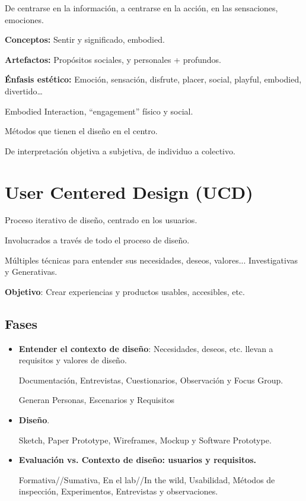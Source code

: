 \documentclass[12pt, twoside, openright]{report} %
\begin{document}
De centrarse en la información, a centrarse en la acción, en las
sensaciones, emociones.

\textbf{Conceptos:} Sentir y significado, embodied.

\textbf{Artefactos:} Propósitos sociales, y personales + profundos.

\textbf{Énfasis estético:} Emoción, sensación, disfrute, placer, social,
playful, embodied, divertido\ldots{}

Embodied Interaction, \enquote{engagement} físico y social.

Métodos que tienen el diseño en el centro.

De interpretación objetiva a subjetiva, de individuo a colectivo.

\section{User Centered Design (UCD)}

Proceso iterativo de diseño, centrado en los usuarios.

Involucrados a través de todo el proceso de diseño.

Múltiples técnicas para entender sus necesidades, deseos,
valores... Investigativas y Generativas.

\textbf{Objetivo}: Crear experiencias y productos usables, accesibles,
etc.
\pagebreak

\subsection{Fases}

\begin{itemize}
	\item \textbf{Entender el contexto de diseño}: Necesidades, deseos, etc.
	      llevan a requisitos y valores de diseño.

	      Documentación, Entrevistas, Cuestionarios, Observación y Focus Group.

	      Generan Personas, Escenarios y Requisitos
	\item \textbf{Diseño}.

	      Sketch, Paper Prototype, Wireframes, Mockup y Software Prototype.
	\item \textbf{Evaluación vs. Contexto de diseño: usuarios y requisitos.}

	      Formativa//Sumativa, En el lab//In the wild, Usabilidad, Métodos de
	      inspección, Experimentos, Entrevistas y observaciones.
\end{itemize}
\end{document}
